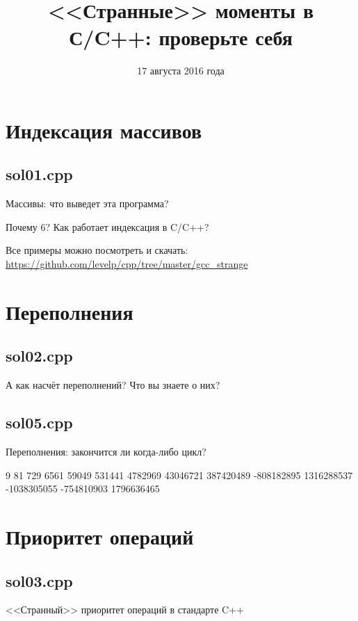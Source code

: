 \documentclass[mathserif,utf8,xcolor=table,11pt]{beamer}
\title{<<Странные>> моменты в С/C++: проверьте себя}
\institute{Степулёнок Денис Олегович}
\date[август 2016]{17 августа 2016 года}
\begin{document}
\section{Индексация массивов}
\subsection{sol01.cpp}
\begin{frame}[t]{Массивы: что выведет эта программа?}
  
  

Почему $6$? Как работает индексация в C/C++?

Все примеры можно посмотреть и скачать:
\url{https://github.com/levelp/cpp/tree/master/gcc_strange}

\end{frame}


\section{Переполнения}
\subsection{sol02.cpp}
\begin{frame}[t]{А как насчёт переполнений? Что вы знаете о них?}
  
\end{frame}

\subsection{sol05.cpp}
\begin{frame}[t]{Переполнения: закончится ли когда-либо цикл?}
  

9
81
729
6561
59049
531441
4782969
43046721
387420489
-808182895
1316288537
-1038305055
-754810903
1796636465
\end{frame}

\section{Приоритет операций}
\subsection{sol03.cpp}
\begin{frame}[t]{<<Странный>> приоритет операций в стандарте C++}
  

  
\end{frame}
\end{document}
